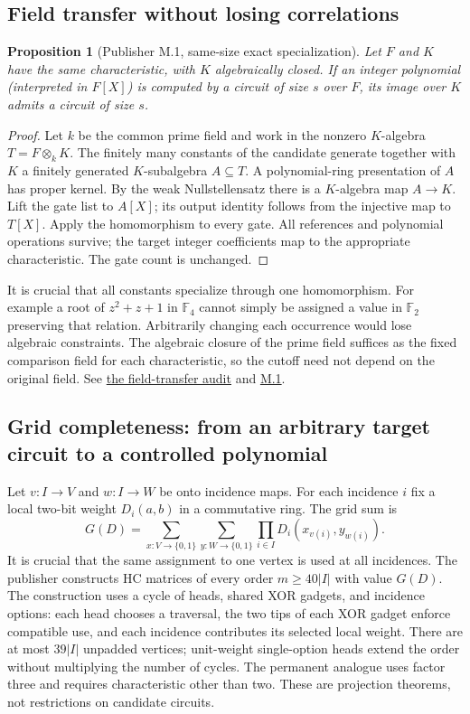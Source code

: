 \documentclass[11pt,letterpaper]{article}
\newtheorem{proposition}[theorem]{Proposition}
\theoremstyle{definition}\newtheorem{definition}[theorem]{Definition}\newtheorem{example}[theorem]{Example}
\theoremstyle{remark}\newtheorem{remark}[theorem]{Remark}
\newcommand{\F}{\mathbb{F}}
\newcommand{\pub}[3]{\href{https://github.com/anthropics/formal-math/blob/11b6c7e3c927df2658f513b6b68ea7f8929c62c5/vp-vnp/#1\#L#2}{#3}}
\newcommand{\aud}[2]{\href{https://github.com/nousentllc/VP-VNP-Review/blob/567303d0bcf4f9d54390437b137752446e58ccd6/#1}{#2}}
\begin{document}
\subsection{Field transfer without losing correlations}\label{sec:field}
\begin{proposition}[Publisher M.1, same-size exact specialization]\label{prop:field}
Let $F$ and $K$ have the same characteristic, with $K$ algebraically closed. If an integer polynomial (interpreted in $F[X]$) is computed by a circuit of size $s$ over $F$, its image over $K$ admits a circuit of size $s$.
\end{proposition}
\begin{proof}
Let $k$ be the common prime field and work in the nonzero $K$-algebra $T=F\otimes_k K$. The finitely many constants of the candidate generate together with $K$ a finitely generated $K$-subalgebra $A\subseteq T$. A polynomial-ring presentation of $A$ has proper kernel. By the weak Nullstellensatz there is a $K$-algebra map $A\to K$. Lift the gate list to $A[X]$; its output identity follows from the injective map to $T[X]$. Apply the homomorphism to every gate. All references and polynomial operations survive; the target integer coefficients map to the appropriate characteristic. The gate count is unchanged.
\end{proof}
It is crucial that all constants specialize through one homomorphism. For example a root of $z^2+z+1$ in $\F_4$ cannot simply be assigned a value in $\F_2$ preserving that relation. Arbitrarily changing each occurrence would lose algebraic constraints. The algebraic closure of the prime field suffices as the fixed comparison field for each characteristic, so the cutoff need not depend on the original field. See \aud{passes/11d-field-transfer.md}{the field-transfer audit} and \pub{Paper/Transfer.lean}{21}{M.1}.

\subsection{Grid completeness: from an arbitrary target circuit to a controlled polynomial}\label{sec:grid}
Let $v:I\to V$ and $w:I\to W$ be onto incidence maps. For each incidence $i$ fix a local two-bit weight $D_i(a,b)$ in a commutative ring. The grid sum is
\[
 G(D)=\sum_{x:V\to\{0,1\}}\sum_{y:W\to\{0,1\}}
         \prod_{i\in I}D_i(x_{v(i)},y_{w(i)}).
\]
It is crucial that the same assignment to one vertex is used at all incidences. The publisher constructs HC matrices of every order $m\ge40|I|$ with value $G(D)$. The construction uses a cycle of heads, shared XOR gadgets, and incidence options: each head chooses a traversal, the two tips of each XOR gadget enforce compatible use, and each incidence contributes its selected local weight. There are at most $39|I|$ unpadded vertices; unit-weight single-option heads extend the order without multiplying the number of cycles. The permanent analogue uses factor three and requires characteristic other than two. These are projection theorems, not restrictions on candidate circuits.
\end{document}
